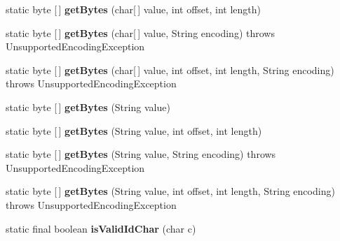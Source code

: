 \begin{DoxyCompactItemize}
static byte \mbox{[}$\,$\mbox{]} {\bfseries get\+Bytes} (char\mbox{[}$\,$\mbox{]} value, int offset, int length)
\item 
\mbox{\label{classcom_1_1mysql_1_1jdbc_1_1_string_utils_a5f606c97eb464cdfa06e48b3a46b6c88}} 
static byte \mbox{[}$\,$\mbox{]} {\bfseries get\+Bytes} (char\mbox{[}$\,$\mbox{]} value, String encoding)  throws Unsupported\+Encoding\+Exception 
\item 
\mbox{\label{classcom_1_1mysql_1_1jdbc_1_1_string_utils_aeec7b6dd75381e95ed54dbcada1514e3}} 
static byte \mbox{[}$\,$\mbox{]} {\bfseries get\+Bytes} (char\mbox{[}$\,$\mbox{]} value, int offset, int length, String encoding)  throws Unsupported\+Encoding\+Exception 
\item 
\mbox{\label{classcom_1_1mysql_1_1jdbc_1_1_string_utils_a834e5a9f957c2835f4f5342ec4a75afe}} 
static byte \mbox{[}$\,$\mbox{]} {\bfseries get\+Bytes} (String value)
\item 
\mbox{\label{classcom_1_1mysql_1_1jdbc_1_1_string_utils_a03ae4296a6877178239daaa9acde81f0}} 
static byte \mbox{[}$\,$\mbox{]} {\bfseries get\+Bytes} (String value, int offset, int length)
\item 
\mbox{\label{classcom_1_1mysql_1_1jdbc_1_1_string_utils_aaf0cc5b4521c4bd4eb56f2e70aff6f46}} 
static byte \mbox{[}$\,$\mbox{]} {\bfseries get\+Bytes} (String value, String encoding)  throws Unsupported\+Encoding\+Exception 
\item 
\mbox{\label{classcom_1_1mysql_1_1jdbc_1_1_string_utils_a518e459c4cac204f4a724f1a618b62db}} 
static byte \mbox{[}$\,$\mbox{]} {\bfseries get\+Bytes} (String value, int offset, int length, String encoding)  throws Unsupported\+Encoding\+Exception 
\item 
\mbox{\label{classcom_1_1mysql_1_1jdbc_1_1_string_utils_a2ab1d8afcb0858387b1f2a26f9b9dd06}} 
static final boolean {\bfseries is\+Valid\+Id\+Char} (char c)
\item 

\end{DoxyCompactItemize}
